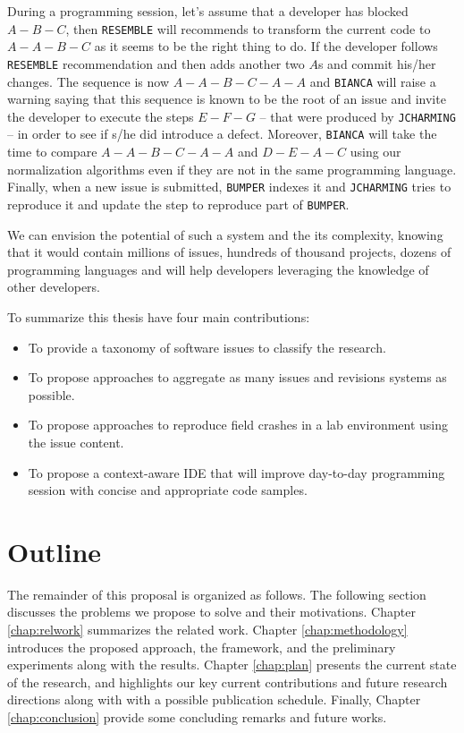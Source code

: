 During a programming session, let's assume that a developer has blocked $A-B-C$, then {\tt RESEMBLE} will recommends to transform the current code to $A-A-B-C$ as it seems to be the right thing to do.
If the developer follows {\tt RESEMBLE} recommendation and then adds another two $A$s and commit his/her changes.
The sequence is now $A-A-B-C-A-A$ and {\tt BIANCA} will raise a warning saying that this sequence is known to be the root of an issue and invite the developer to execute the steps $E-F-G$ -- that were produced by {\tt JCHARMING} -- in order to see if s/he did introduce a defect. Moreover, {\tt BIANCA} will take the time to compare $A-A-B-C-A-A$ and $D-E-A-C$ using our normalization algorithms even if they are not in the same programming language.
Finally, when a new issue is submitted, {\tt BUMPER} indexes it and {\tt JCHARMING} tries to reproduce it and update the step to reproduce part of {\tt BUMPER}.

We can envision the potential of such a system and the its complexity, knowing that it would contain millions of issues, hundreds of thousand projects, dozens of programming languages and will help developers leveraging the knowledge of other developers.

To summarize this thesis have four main contributions:

\begin{itemize}
	\item To provide a taxonomy of software issues to classify the research.
	\item To propose approaches to aggregate as many issues and revisions systems as possible.
	\item To propose approaches to reproduce field crashes in a lab environment using the issue content.
	\item To propose a context-aware IDE that will improve day-to-day programming session with concise and appropriate code samples.
\end{itemize}



\section{Outline\label{sec:outline}}

The remainder of this proposal is organized as follows. The following section discusses the problems we propose to solve and their motivations. Chapter \ref{chap:relwork} summarizes the related work.
Chapter \ref{chap:methodology} introduces the proposed approach, the framework, and the preliminary experiments along with the results.
Chapter \ref{chap:plan} presents the current state of the research, and highlights our key current contributions and future research directions along with with a possible publication schedule.
Finally, Chapter \ref{chap:conclusion} provide some concluding remarks and future works.
